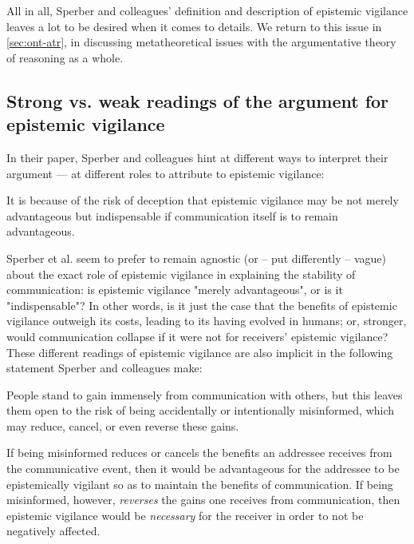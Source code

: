 All in all, Sperber and colleagues' definition and description of epistemic vigilance leaves a lot to be desired when it comes to details. We return to this issue in \cref{sec:ont-atr}, in discussing metatheoretical issues with the argumentative theory of reasoning as a whole.

\subsection{Strong vs. weak readings of the argument for epistemic vigilance}
\label{sec:strong-weak}

In their \citeyear{Sperber10} paper, Sperber and colleagues hint at different ways to interpret their argument --- at different roles to attribute to epistemic vigilance:

\begin{quoting}
    It is because of the risk of deception that epistemic vigilance may be not merely advantageous but indispensable if communication itself is to remain advantageous.
\end{quoting}
Sperber et al. seem to prefer to remain agnostic (or -- put differently -- vague) about the exact role of epistemic vigilance in explaining the stability of communication: is epistemic vigilance "merely advantageous", or is it "indispensable"? In other words, is it just the case that the benefits of epistemic vigilance outweigh its costs, leading to its having evolved in humans; or, stronger, would communication collapse if it were not for receivers' epistemic vigilance?
These different readings of epistemic vigilance are also implicit in the following statement Sperber and colleagues make:
\begin{quoting}
    People stand to gain immensely from communication with others, but this leaves them open to the risk of being accidentally or intentionally misinformed, which may reduce, cancel, or even reverse these gains.
\end{quoting}
If being misinformed reduces or cancels the benefits an addressee receives from the communicative event, then it would be advantageous for the addressee to be epistemically vigilant so as to maintain the benefits of communication. If being misinformed, however, \emph{reverses} the gains one receives from communication, then epistemic vigilance would be \emph{necessary} for the receiver in order to not be negatively affected.

